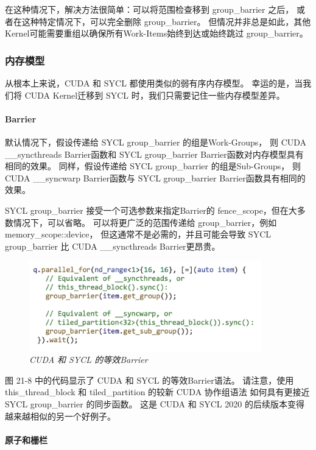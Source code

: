 在这种情况下，解决方法很简单：可以将范围检查移到 group\_barrier 之后，
或者在这种特定情况下，可以完全删除 group\_barrier。 
但情况并非总是如此，其他Kernel可能需要重组以确保所有Work-Items始终到达或始终跳过 group\_barrier。

\subsubsection{内存模型}
从根本上来说，CUDA 和 SYCL 都使用类似的弱有序内存模型。 
幸运的是，当我们将 CUDA Kernel迁移到 SYCL 时，我们只需要记住一些内存模型差异。

\paragraph{Barrier}

默认情况下，假设传递给 SYCL group\_barrier 的组是Work-Groups，
则 CUDA \_\_syncthreads Barrier函数和 SYCL group\_barrier Barrier函数对内存模型具有相同的效果。 
同样，假设传递给 SYCL group\_barrier 的组是Sub-Groups，
则 CUDA \_\_syncwarp Barrier函数与 SYCL group\_barrier Barrier函数具有相同的效果。

SYCL group\_barrier 接受一个可选参数来指定Barrier的 fence\_scope，但在大多数情况下，可以省略。 
可以将更广泛的范围传递给 group\_barrier，例如 memory\_scope::device，
但这通常不是必需的，并且可能会导致 SYCL group\_barrier 比 CUDA \_\_syncthreads Barrier更昂贵。

\begin{figure}[H]
	\centering
	\includegraphics[width=0.9\textwidth]{figs/F21.8.png}
	\caption{\textit{CUDA 和 SYCL 的等效Barrier }}
\end{figure}

图 21-8 中的代码显示了 CUDA 和 SYCL 的等效Barrier语法。 
请注意，使用 this\_thread\_block 和 tiled\_partition 的较新 CUDA 协作组语法
如何具有更接近 SYCL group\_barrier 的同步函数。 
这是 CUDA 和 SYCL 2020 的后续版本变得越来越相似的另一个好例子。

\paragraph{原子和栅栏}

